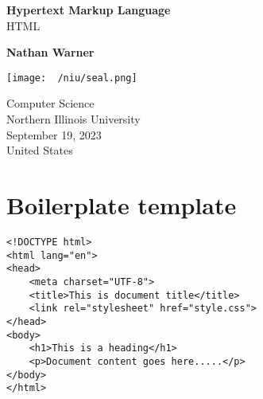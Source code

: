 \documentclass{report}
\title{\Huge{}}
\author{\huge{Nathan Warner}}
\date{\huge{}}
\begin{document}
        \begin{titlepage}
       \begin{center}
           \vspace*{1cm}
    
           \textbf{Hypertext Markup Language} \\
           HTML 
    
           \vspace{0.5cm}
            
                
           \vspace{1.5cm}
    
           \textbf{Nathan Warner}
    
           \vfill
                
                
           \vspace{0.8cm}
         
           \texttt{[image: ~/niu/seal.png]}
                
           Computer Science \\
           Northern Illinois University\\
           September 19, 2023 \\
           United States\\
           
                
       \end{center}
    \end{titlepage}
    \tableofcontents
    \pagebreak \bigbreak \noindent
    \section{\LARGE Boilerplate template}
    \bigbreak \noindent 
    \sepline
    \begin{verbatim}
<!DOCTYPE html>
<html lang="en">
<head>
    <meta charset="UTF-8">
    <title>This is document title</title>
    <link rel="stylesheet" href="style.css">
</head>
<body>
    <h1>This is a heading</h1>
    <p>Document content goes here.....</p>
</body>
</html>  
    \end{verbatim}
    \sepline
    \bigbreak \noindent 
\end{document}
